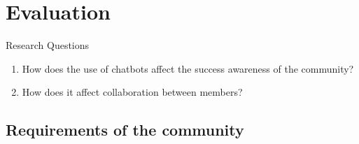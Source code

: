 \section{Evaluation}
\begin{frame}{Research Questions}
  \begin{enumerate}
    \item How does the use of chatbots affect the success awareness of the community?
    \item How does it affect collaboration between members?
  \end{enumerate}
\end{frame}

\subsection{Requirements of the community}
